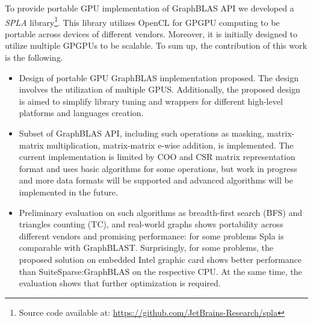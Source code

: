 To provide portable GPU implementation of GraphBLAS API we developed a \textit{SPLA} library\footnote{Source code available at: \url{https://github.com/JetBrains-Research/spla}}.
This library utilizes OpenCL for GPGPU computing to be portable across devices of different vendors.
Moreover, it is initially designed to utilize multiple GPGPUs to be scalable.
To sum up, the contribution of this work is the following.
\begin{itemize}
    \item Design of portable GPU GraphBLAS implementation proposed. The design involves the utilization of multiple GPUS. Additionally, the proposed design is aimed to simplify library tuning and wrappers for different high-level platforms and languages creation. 
    \item Subset of GraphBLAS API, including such operations as masking, matrix-matrix multiplication, matrix-matrix e-wise addition, is implemented. The current implementation is limited by COO and CSR matrix representation format and uses basic algorithms for some operations, but work in progress and more data formats will be supported and advanced algorithms will be implemented in the future.
    \item Preliminary evaluation on such algorithms as breadth-first search (BFS) and triangles counting (TC), and real-world graphs shows portability across different vendors and promising performance: for some problems Spla is comparable with GraphBLAST. Surprisingly, for some problems, the proposed solution on embedded Intel graphic card shows better performance than SuiteSparse:GraphBLAS on the respective CPU. At the same time, the evaluation shows that further optimization is required.
\end{itemize} 